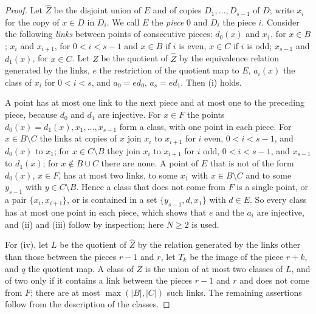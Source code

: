 \documentclass[11pt,a4paper]{article}
\theoremstyle{definition}
\begin{document}
\begin{proof}
Let $\widehat Z$ be the disjoint union of $E$ and of copies $D_1,\dots,D_{s-1}$
of $D$; write $x_i$ for the copy of $x\in D$ in $D_i$. We call $E$ the
\emph{piece} $0$ and $D_i$ the piece $i$. Consider the following \emph{links}
between points of consecutive pieces: $d_0(x)$ and $x_1$, for $x\in B$; $x_i$
and $x_{i+1}$, for $0<i<s-1$ and $x\in B$ if $i$ is even, $x\in C$ if $i$ is
odd; $x_{s-1}$ and $d_1(x)$, for $x\in C$. Let $Z$ be the quotient of
$\widehat Z$ by the equivalence relation generated by the links, $e$ the
restriction of the quotient map to $E$, $a_i(x)$ the class of $x_i$ for
$0<i<s$, and $a_0=ed_0$, $a_s=ed_1$. Then (i) holds.

A point has at most one link to the next piece and at most one to the
preceding piece, because $d_0$ and $d_1$ are injective. For $x\in F$ the
points $d_0(x)=d_1(x),x_1,\dots,x_{s-1}$ form a class, with one point in each
piece. For $x\in B\setminus C$ the links at copies of $x$ join $x_i$ to
$x_{i+1}$ for $i$ even, $0<i<s-1$, and $d_0(x)$ to $x_1$; for
$x\in C\setminus B$ they join $x_i$ to $x_{i+1}$ for $i$ odd, $0<i<s-1$, and
$x_{s-1}$ to $d_1(x)$; for $x\notin B\cup C$ there are none. A point of $E$ that
is not of the form $d_0(x)$, $x\in F$, has at most two links, to some $x_1$
with $x\in B\setminus C$ and to some $y_{s-1}$ with $y\in C\setminus B$. Hence a
class that does not come from $F$ is a single point, or a pair
$\{x_i,x_{i+1}\}$, or is contained in a set $\{y_{s-1},d,x_1\}$ with $d\in E$.
So every class has at most one point in each piece, which shows that $e$ and
the $a_i$ are injective, and (ii) and (iii) follow by inspection; here
$N\ge 2$ is used.

For (iv), let $L$ be the quotient of $\widehat Z$ by the relation generated
by the links other than those between the pieces $r-1$ and $r$, let $T_k$ be
the image of the piece $r+k$, and $q$ the quotient map. A class of $Z$ is the
union of at most two classes of $L$, and of two only if it contains a link
between the pieces $r-1$ and $r$ and does not come from $F$; there are at
most $\max(|B|,|C|)$ such links. The remaining assertions follow from the
description of the classes.


\end{proof}
\end{document}
